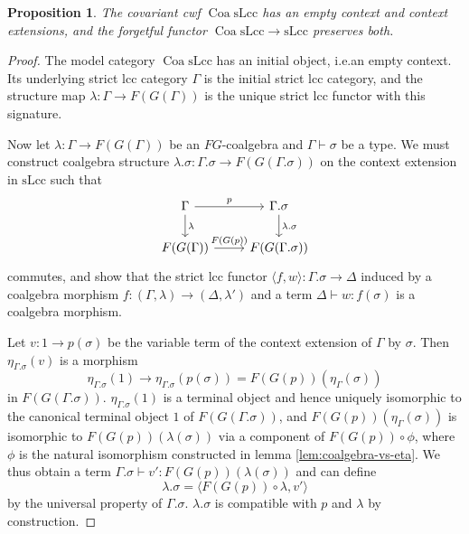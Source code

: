 \documentclass[a4paper]{article}
\newtheorem{proposition}[theorem]{Proposition}
\theoremstyle{remark}
\theoremstyle{definition}
\begin{document}
\begin{proposition}
  \label{prop:coa-slcc-exts}
  The covariant cwf $\operatorname{Coa} \mathrm{sLcc}$ has an empty context and context extensions, and the forgetful functor $\operatorname{Coa} \mathrm{sLcc} \rightarrow \mathrm{sLcc}$ preserves both.
\end{proposition}
\begin{proof}
  The model category $\operatorname{Coa} \mathrm{sLcc}$ has an initial object, i.e.\@ an empty context.
  Its underlying strict lcc category $\Gamma$ is the initial strict lcc category, and the structure map $\lambda : \Gamma \rightarrow F(G(\Gamma))$ is the unique strict lcc functor with this signature.

  Now let $\lambda : \Gamma \rightarrow F(G(\Gamma))$ be an $FG$-coalgebra and $\Gamma \vdash \sigma$ be a type.
  We must construct coalgebra structure $\lambda.\sigma : \Gamma.\sigma \rightarrow F(G(\Gamma.\sigma))$ on the context extension in $\mathrm{sLcc}$ such that
  \begin{equation}
    \begin{tikzcd}
      \Gamma \arrow[r, "p"] \arrow[d, "\lambda"] & \Gamma.\sigma \arrow[d, "\lambda.\sigma"] \\
      F(G(\Gamma)) \arrow[r, "F(G(p))"] & F(G(\Gamma.\sigma))
    \end{tikzcd}
  \end{equation}
  commutes, and show that the strict lcc functor $\langle f, w \rangle : \Gamma.\sigma \rightarrow \Delta$ induced by a coalgebra morphism $f : (\Gamma, \lambda) \rightarrow (\Delta, \lambda')$ and a term $\Delta \vdash w : f(\sigma)$ is a coalgebra morphism.

  Let $v : 1 \rightarrow p(\sigma)$ be the variable term of the context extension of $\Gamma$ by $\sigma$.
  Then $\eta_{\Gamma.\sigma}(v)$ is a morphism
  \begin{equation}
    \eta_{\Gamma.\sigma}(1) \rightarrow \eta_{\Gamma.\sigma}(p(\sigma)) = F(G(p))(\eta_\Gamma(\sigma))
  \end{equation}
  in $F(G(\Gamma.\sigma))$.
  $\eta_{\Gamma.\sigma}(1)$ is a terminal object and hence uniquely isomorphic to the canonical terminal object $1$ of $F(G(\Gamma.\sigma))$, and $F(G(p))(\eta_\Gamma(\sigma))$ is isomorphic to $F(G(p))(\lambda(\sigma))$ via a component of $F(G(p)) \circ \phi$, where $\phi$ is the natural isomorphism constructed in lemma \ref{lem:coalgebra-vs-eta}.
  We thus obtain a term $\Gamma.\sigma \vdash v' : F(G(p))(\lambda(\sigma))$ and can define
  \begin{equation}
    \lambda.\sigma = \langle F(G(p)) \circ \lambda, v' \rangle
  \end{equation}
  by the universal property of $\Gamma.\sigma$.
  $\lambda.\sigma$ is compatible with $p$ and $\lambda$ by construction.


\end{proof}
\end{document}
